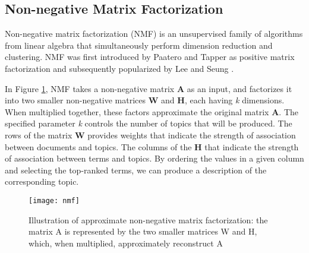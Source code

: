 \subsection{Non-negative Matrix Factorization}

Non-negative matrix factorization (NMF) is an unsupervised family of algorithms from linear algebra that simultaneously perform dimension reduction and clustering. NMF was first introduced by Paatero and Tapper \cite{paa94} as positive matrix factorization and subsequently
popularized by Lee and Seung \cite{lee99}.

In Figure \ref{fig:nmf}, NMF takes a non-negative matrix \textbf{A} as an input, and factorizes it into two smaller non-negative matrices \textbf{W} and \textbf{H}, each having \textit{k} dimensions. When multiplied together, these factors approximate the original matrix \textbf{A}. The specified parameter \textit{k} controls the number of topics that will be produced. The rows of the matrix \textbf{W} provides weights that indicate the strength of association between documents and topics. The columns of the \textbf{H} that indicate the strength of association between terms and topics. By ordering the values in a given column and selecting the top-ranked terms, we can produce a description of the corresponding topic.

\begin{figure}
  \texttt{[image: nmf]}
  \caption{Illustration of approximate non-negative matrix factorization: the matrix A is represented by the two smaller matrices W and H, which, when multiplied, approximately reconstruct A}
  \label{fig:nmf}
\end{figure}
